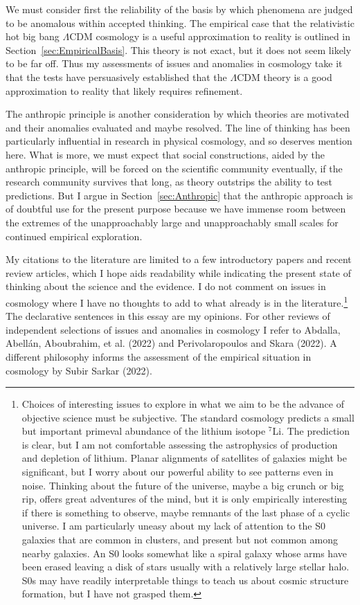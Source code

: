 \documentclass[fleqn,usenatbib]{mnras}
\begin{document}
We must consider first the reliability of the basis by which phenomena are judged to be anomalous within accepted thinking. The empirical case that the relativistic hot big bang $\Lambda$CDM cosmology is a useful approximation to reality is outlined in Section~\ref{sec:EmpiricalBasis}. This theory is not exact, but it does not seem likely to be far off. Thus my assessments of issues and anomalies in cosmology take it that the tests have persuasively established that the $\Lambda$CDM theory is a good approximation to reality that likely requires refinement.

The anthropic principle is another consideration by which theories are motivated and their anomalies evaluated and maybe resolved. The line of thinking has been particularly influential in research in physical cosmology, and so deserves mention here. What is more, we must expect that social constructions, aided by the anthropic principle, will be forced on the scientific community eventually, if the research community survives that long, as theory outstrips the ability to test predictions. But I argue in Section~\ref{sec:Anthropic} that the anthropic approach is of doubtful use for the present purpose because we have immense room between the extremes of the unapproachably large and unapproachably small scales for continued empirical exploration.

My citations to the literature are limited to a few introductory papers and recent review articles, which I hope aids readability while indicating the present state of thinking about the science and the evidence. I do not comment on issues in cosmology where I have no thoughts to add to what already is in the literature.\footnote{\label{fn:S0s}Choices of interesting issues to explore in what we aim to be the advance of objective science must be subjective. The standard cosmology predicts a small but important primeval abundance of the lithium isotope $^7$Li. The prediction is clear, but I am not comfortable assessing the astrophysics of production and depletion of lithium. Planar alignments of satellites of galaxies might be significant, but I worry about our powerful ability to see patterns even in noise. Thinking about the future of the universe, maybe a big crunch or big rip, offers great adventures of the mind, but it is only empirically interesting if there is something to observe, maybe remnants of the last phase of a cyclic universe. I am particularly uneasy about my lack of attention to the S0 galaxies that are common in clusters, and present but not common among nearby galaxies. An S0 looks somewhat like a spiral galaxy whose arms have been erased leaving a disk of stars usually with a relatively large stellar halo. S0s may have readily interpretable things to teach us about cosmic structure formation, but I have not grasped them.} The declarative sentences in this essay are my opinions. For other reviews of independent selections of issues and anomalies in cosmology I refer to Abdalla, Abell{\'a}n, Aboubrahim, et al. (2022) and Perivolaropoulos and Skara (2022). A different philosophy informs the assessment of the empirical situation in cosmology by Subir Sarkar (2022). 
\end{document}
